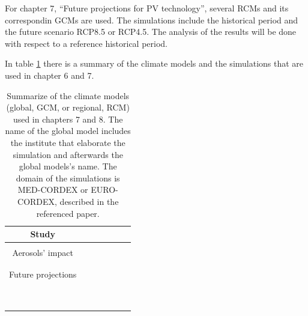 For chapter 7, ``Future projections for PV technology'', several RCMs and its correspondin GCMs are used. The simulations include the historical period and the future scenario RCP8.5 or RCP4.5. The analysis of the results will be done with respect to a reference historical period.

In table \ref{climatemodels} there is a summary of the climate models and the simulations that are used in chapter 6 and 7.

\begin{table}[h!]
  \begin{tabular}{c|>{\raggedrigth}m{1.2cm}>{\raggedright}m{1.5cm}>{\raggedright}m{2cm}>{\raggedright}m{1.5cm}>{\raggedright}m{1.5cm}>{\raggedright}m{2cm}}
    \toprule 
    Study & \centering{Climate Model}  & &  \tabularnewline
    \midrule                                                         
    & \centering{GCM} & \centering{RCM} & \centering{Domain} & \centering{Resolution RCM} &\centering{Simulation} \tabularnewline                                            
    \midrule
     Aerosols' impact & \centering{CNRM-CM5} & \centering{CNRM-ALADIN53} & \centering{MED-CORDEX} & \centering{0.44º} & \centering{AER}\midrule\\
    \centering{NO-AER}\midrule\\
    \centering{TREND}
    \tabularnewline
   \midrule
    Future projections & \centering{CNRM-CM5} & \centering{ALADIN53}\midrule\\
    \centering{RCA4}\midrule\\
    \centering{CCLM4}\midrule & \centering{EURO-CORDEX} & \centering{0.11º} & \centering{HIST/RCP85}\\
    \centering{HIST/RCP85}\\
    \centering{HIST/RCP85}
    \tabularnewline
          & \centering{ICHEC-EC-EARTH} & \centering{RACMO}\midrule\\
    \centering{RCA4}\midrule\\
    \centering{CCLM4}\midrule & \centering{EURO-CORDEX} & \centering{0.11º} & \centering{HIST/RCP85}\\
    \centering{HIST/RCP85}\\
    \centering{HIST/RCP85}
    \tabularnewline
 \bottomrule
  \end{tabular}
  \caption{Summarize of the climate models (global, GCM, or regional, RCM) used in chapters 7 and 8. The name of the global model includes the institute that elaborate the simulation and afterwards the global models's name. The domain of the simulations is MED-CORDEX or EURO-CORDEX, described in the referenced paper.}
  \label{climatemodels}
\end{table}
 

